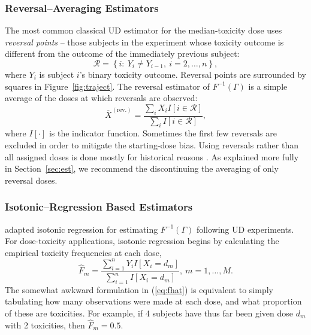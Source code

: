 \subsubsection{Reversal--Averaging Estimators}

The most common classical UD estimator for the median-toxicity dose uses \emph{reversal points} -- those subjects in the experiment whose toxicity outcome is different from the outcome of the immediately previous subject:
%
\begin{equation}\label{eq:reversal}
\mathcal{R}=\left\{i:\ Y_i\neq Y_{i-1},\ i=2,\ldots ,n\right\},
\end{equation}
where $Y_i$ is subject $i$'s binary toxicity outcome. Reversal points are surrounded by squares in Figure~\ref{fig:traject}. The reversal estimator of $F^{-1}(\Gamma)$ is a simple average of the doses at which reversals are observed:
\begin{equation}\label{eq:reversav}
\overline{X}^{\mathrm{(rev.)}}=\frac{\sum_iX_iI\left[i\in\mathcal{R}\right]}{\sum_iI\left[i\in\mathcal{R}\right]},
\end{equation}
\noindent where $I[\cdot]$ is the indicator function. Sometimes the first few reversals are excluded in order to mitigate the starting-dose bias. Using reversals rather than all assigned doses is done mostly for historical reasons \citep{Weth:Chen:Vasu:est:1966}. As explained more fully in Section~\ref{sec:est}, we recommend the discontinuing  the averaging of only reversal doses.

\subsubsection{Isotonic--Regression Based Estimators}

\cite{Styl:Flou:dose:2002} adapted isotonic regression \citep{BBBB:order:1972} for estimating $F^{-1}(\Gamma)$ following UD experiments. For dose-toxicity applications, isotonic regression begins by calculating the empirical toxicity frequencies at each dose,
%
\begin{equation}\label{eq:fhat}
\hat{F}_m=\frac{\sum_{i=1}^n Y_iI\left[X_i=d_m\right]}{\sum_{i=1}^n I\left[X_i=d_m\right]},\ m=1,\ldots,M.
\end{equation}
%
The somewhat awkward formulation in (\ref{eq:fhat}) is equivalent to simply tabulating how many observations were made at each dose, and what proportion of these are toxicities. For example, if 4 subjects have thus far been given dose $d_m$ with 2 toxicities, then $\hat{F}_m=0.5$.

